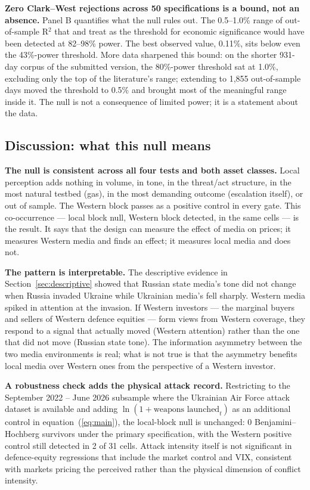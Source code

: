 \documentclass[12pt,a4paper]{article}
\begin{document}
\textbf{Zero Clark--West rejections across 50 specifications is a bound, not an absence.} Panel B quantifies what the null rules out. The 0.5--1.0\% range of out-of-sample R$^2$ that \citet{welch2008} and \citet{campbell2008} treat as the threshold for economic significance would have been detected at 82--98\% power. The best observed value, 0.11\%, sits below even the 43\%-power threshold. More data sharpened this bound: on the shorter 931-day corpus of the submitted version, the 80\%-power threshold sat at 1.0\%, excluding only the top of the literature's range; extending to 1,855 out-of-sample days moved the threshold to 0.5\% and brought most of the meaningful range inside it. The null is not a consequence of limited power; it is a statement about the data.

\subsection{Discussion: what this null means}
\label{sec:robustness}

\textbf{The null is consistent across all four tests and both asset classes.} Local perception adds nothing in volume, in tone, in the threat/act structure, in the most natural testbed (gas), in the most demanding outcome (escalation itself), or out of sample. The Western block passes as a positive control in every gate. This co-occurrence --- local block null, Western block detected, in the same cells --- is the result. It says that the design can measure the effect of media on prices; it measures Western media and finds an effect; it measures local media and does not.

\textbf{The pattern is interpretable.} The descriptive evidence in Section~\ref{sec:descriptive} showed that Russian state media's tone did not change when Russia invaded Ukraine while Ukrainian media's fell sharply. Western media spiked in attention at the invasion. If Western investors --- the marginal buyers and sellers of Western defence equities --- form views from Western coverage, they respond to a signal that actually moved (Western attention) rather than the one that did not move (Russian state tone). The information asymmetry between the two media environments is real; what is not true is that the asymmetry benefits local media over Western ones from the perspective of a Western investor.

\textbf{A robustness check adds the physical attack record.} Restricting to the September 2022 -- June 2026 subsample where the Ukrainian Air Force attack dataset is available and adding $\ln(1 + \text{weapons launched}_t)$ as an additional control in equation~(\ref{eq:main}), the local-block null is unchanged: 0 Benjamini--Hochberg survivors under the primary specification, with the Western positive control still detected in 2 of 31 cells. Attack intensity itself is not significant in defence-equity regressions that include the market control and VIX, consistent with markets pricing the perceived rather than the physical dimension of conflict intensity.
\end{document}
